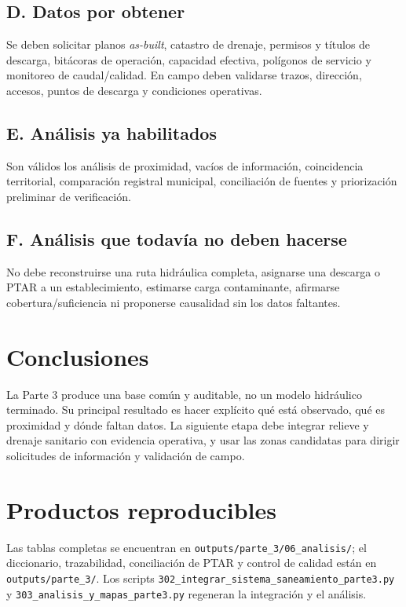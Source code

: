 \documentclass[11pt,letterpaper]{article}
\begin{document}
\subsection*{D. Datos por obtener}
Se deben solicitar planos \emph{as-built}, catastro de drenaje, permisos y títulos de descarga, bitácoras de operación, capacidad efectiva, polígonos de servicio y monitoreo de caudal/calidad. En campo deben validarse trazos, dirección, accesos, puntos de descarga y condiciones operativas.
\subsection*{E. Análisis ya habilitados}
Son válidos los análisis de proximidad, vacíos de información, coincidencia territorial, comparación registral municipal, conciliación de fuentes y priorización preliminar de verificación.
\subsection*{F. Análisis que todavía no deben hacerse}
No debe reconstruirse una ruta hidráulica completa, asignarse una descarga o PTAR a un establecimiento, estimarse carga contaminante, afirmarse cobertura/suficiencia ni proponerse causalidad sin los datos faltantes.

\section{Conclusiones}
La Parte 3 produce una base común y auditable, no un modelo hidráulico terminado. Su principal resultado es hacer explícito qué está observado, qué es proximidad y dónde faltan datos. La siguiente etapa debe integrar relieve y drenaje sanitario con evidencia operativa, y usar las zonas candidatas para dirigir solicitudes de información y validación de campo.

\appendix
\section{Productos reproducibles}
Las tablas completas se encuentran en \texttt{outputs/parte\_3/06\_analisis/}; el diccionario, trazabilidad, conciliación de PTAR y control de calidad están en \texttt{outputs/parte\_3/}. Los scripts \texttt{302\_integrar\_sistema\_saneamiento\_parte3.py} y \texttt{303\_analisis\_y\_mapas\_parte3.py} regeneran la integración y el análisis.
\end{document}
